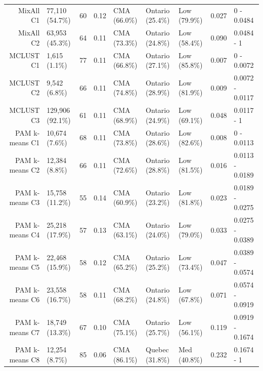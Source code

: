 \documentclass[11pt, a4paper]{article}
\begin{document}
\begin{table}[H]
{\begin{tabular}{|r|llllllll|}
  MixAll C1 & 77,110 (54.7\%) & 60 & 0.12 & CMA (66.0\%) & Ontario (25.4\%) & Low (79.9\%) & 0.027 & 0 - 0.0484 \\ 
  MixAll C2 & 63,953 (45.3\%) & 64 & 0.11 & CMA (73.3\%) & Ontario (24.8\%) & Low (58.4\%) & 0.090 & 0.0484 - 1 \\ 
\rowcolor{gray!25}  MCLUST C1 & 1,615 (1.1\%) & 77 & 0.11 & CMA (66.8\%) & Ontario (27.1\%) & Low (85.8\%) & 0.007 & 0 - 0.0072 \\ 
\rowcolor{gray!25}  MCLUST C2 & 9,542 (6.8\%) & 66 & 0.11 & CMA (74.8\%) & Ontario (28.9\%) & Low (81.9\%) & 0.009 & 0.0072 - 0.0117 \\ 
 \rowcolor{gray!25} MCLUST C3 & 129,906 (92.1\%) & 61 & 0.11 & CMA (68.9\%) & Ontario (24.9\%) & Low (69.1\%) & 0.048 & 0.0117 - 1 \\ 
  PAM k-means C1 & 10,674 (7.6\%) & 68 & 0.11 & CMA (73.8\%) & Ontario (28.6\%) & Low (82.6\%) & 0.008 & 0 - 0.0113 \\ 
  PAM k-means C2 & 12,384 (8.8\%) & 66 & 0.11 & CMA (72.6\%) & Ontario (28.8\%) & Low (81.5\%) & 0.016 & 0.0113 - 0.0189 \\ 
  PAM k-means C3 & 15,758 (11.2\%) & 55 & 0.14 & CMA (60.9\%) & Ontario (23.2\%) & Low (81.8\%) & 0.023 & 0.0189 - 0.0275 \\ 
  PAM k-means C4 & 25,218 (17.9\%) & 57 & 0.13 & CMA (63.1\%) & Ontario (24.0\%) & Low (79.0\%) & 0.033 & 0.0275 - 0.0389 \\ 
  PAM k-means C5 & 22,468 (15.9\%) & 58 & 0.12 & CMA (65.2\%) & Ontario (25.2\%) & Low (73.4\%) & 0.047 & 0.0389 - 0.0574 \\ 
  PAM k-means C6 & 23,558 (16.7\%) & 58 & 0.11 & CMA (68.2\%) & Ontario (24.8\%) & Low (67.8\%) & 0.071 & 0.0574 - 0.0919 \\ 
  PAM k-means C7 & 18,749 (13.3\%) & 67 & 0.10 & CMA (75.1\%) & Ontario (25.7\%) & Low (56.1\%) & 0.119 & 0.0919 - 0.1674 \\ 
  PAM k-means C8 & 12,254 (8.7\%) & 85 & 0.06 & CMA (86.1\%) & Quebec (31.8\%) & Med (40.8\%) & 0.232 & 0.1674 - 1 \\
   \hline
\end{tabular}
}
\end{table}
\end{document}
